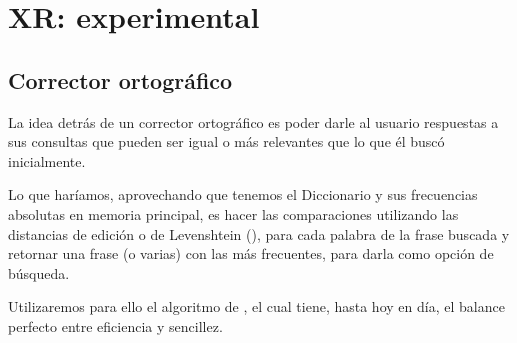\section{XR: experimental}

\subsection{Corrector ortográfico}

La idea detrás de un corrector ortográfico es poder darle al usuario respuestas a sus consultas que pueden ser igual o más relevantes que lo que él buscó inicialmente. 


Lo que haríamos, aprovechando que tenemos el Diccionario y sus frecuencias absolutas en memoria principal, es hacer las comparaciones utilizando las distancias de edición o de Levenshtein (\citet[p.~58]{Manning:2008}), para cada palabra de la frase buscada y retornar una frase (o varias) con las más frecuentes, para darla como opción de búsqueda.

Utilizaremos para ello el algoritmo de \citeauthor{norvigSP}, el cual tiene, hasta hoy en día, el balance perfecto entre eficiencia y sencillez.


